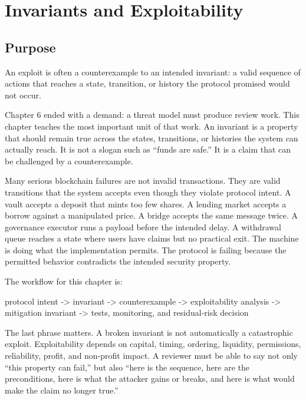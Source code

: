 \chapter{Invariants and Exploitability}

\section{Purpose}

\begin{principlebox}
An exploit is often a counterexample to an intended invariant: a valid sequence of actions that reaches a state, transition, or history the protocol promised would not occur.
\end{principlebox}

Chapter 6 ended with a demand: a threat model must produce review work. This chapter teaches the most important unit of that work. An invariant is a property that should remain true across the states, transitions, or histories the system can actually reach. It is not a slogan such as ``funds are safe.'' It is a claim that can be challenged by a counterexample.

Many serious blockchain failures are not invalid transactions. They are valid transitions that the system accepts even though they violate protocol intent. A vault accepts a deposit that mints too few shares. A lending market accepts a borrow against a manipulated price. A bridge accepts the same message twice. A governance executor runs a payload before the intended delay. A withdrawal queue reaches a state where users have claims but no practical exit. The machine is doing what the implementation permits. The protocol is failing because the permitted behavior contradicts the intended security property.

The workflow for this chapter is:

\begin{codeblock}
protocol intent
    -> invariant
    -> counterexample
    -> exploitability analysis
    -> mitigation invariant
    -> tests, monitoring, and residual-risk decision
\end{codeblock}

The last phrase matters. A broken invariant is not automatically a catastrophic exploit. Exploitability depends on capital, timing, ordering, liquidity, permissions, reliability, profit, and non-profit impact. A reviewer must be able to say not only ``this property can fail,'' but also ``here is the sequence, here are the preconditions, here is what the attacker gains or breaks, and here is what would make the claim no longer true.''

